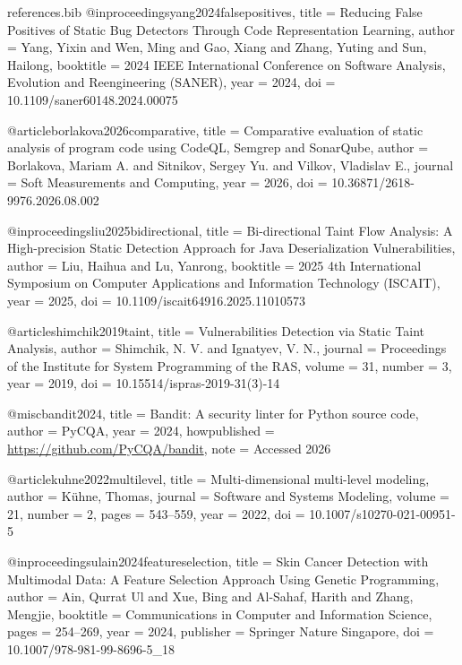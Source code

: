 \begin{filecontents*}{references.bib}
@inproceedings{yang2024falsepositives,
  title     = {Reducing False Positives of Static Bug Detectors Through Code
               Representation Learning},
  author    = {Yang, Yixin and Wen, Ming and Gao, Xiang and Zhang, Yuting and
               Sun, Hailong},
  booktitle = {2024 {IEEE} International Conference on Software Analysis,
               Evolution and Reengineering ({SANER})},
  year      = {2024},
  doi       = {10.1109/saner60148.2024.00075}
}

@article{borlakova2026comparative,
  title   = {Comparative evaluation of static analysis of program code using
             {CodeQL}, {Semgrep} and {SonarQube}},
  author  = {Borlakova, Mariam A. and Sitnikov, Sergey Yu. and Vilkov, Vladislav E.},
  journal = {Soft Measurements and Computing},
  year    = {2026},
  doi     = {10.36871/2618-9976.2026.08.002}
}

@inproceedings{liu2025bidirectional,
  title     = {Bi-directional Taint Flow Analysis: A High-precision Static
               Detection Approach for Java Deserialization Vulnerabilities},
  author    = {Liu, Haihua and Lu, Yanrong},
  booktitle = {2025 4th International Symposium on Computer Applications and
               Information Technology ({ISCAIT})},
  year      = {2025},
  doi       = {10.1109/iscait64916.2025.11010573}
}

@article{shimchik2019taint,
  title   = {Vulnerabilities Detection via Static Taint Analysis},
  author  = {Shimchik, N. V. and Ignatyev, V. N.},
  journal = {Proceedings of the Institute for System Programming of the {RAS}},
  volume  = {31},
  number  = {3},
  year    = {2019},
  doi     = {10.15514/ispras-2019-31(3)-14}
}

@misc{bandit2024,
  title        = {{Bandit}: A security linter for {Python} source code},
  author       = {{PyCQA}},
  year         = {2024},
  howpublished = {\url{https://github.com/PyCQA/bandit}},
  note         = {Accessed 2026}
}

@article{kuhne2022multilevel,
  title   = {Multi-dimensional multi-level modeling},
  author  = {K{\"u}hne, Thomas},
  journal = {Software and Systems Modeling},
  volume  = {21},
  number  = {2},
  pages   = {543--559},
  year    = {2022},
  doi     = {10.1007/s10270-021-00951-5}
}

@inproceedings{ulain2024featureselection,
  title     = {Skin Cancer Detection with Multimodal Data: A Feature Selection
               Approach Using Genetic Programming},
  author    = {Ain, Qurrat Ul and Xue, Bing and Al-Sahaf, Harith and Zhang, Mengjie},
  booktitle = {Communications in Computer and Information Science},
  pages     = {254--269},
  year      = {2024},
  publisher = {Springer Nature Singapore},
  doi       = {10.1007/978-981-99-8696-5_18}
}


\end{filecontents*}
